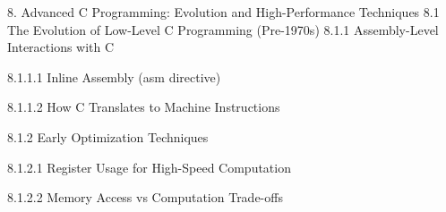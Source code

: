 8. Advanced C Programming: Evolution and High-Performance Techniques
8.1 The Evolution of Low-Level C Programming (Pre-1970s)
8.1.1 Assembly-Level Interactions with C

8.1.1.1 Inline Assembly (asm directive)

8.1.1.2 How C Translates to Machine Instructions

8.1.2 Early Optimization Techniques

8.1.2.1 Register Usage for High-Speed Computation

8.1.2.2 Memory Access vs Computation Trade-offs
\begin{comment}
8.2 Bit Manipulation and CPU Architecture Integration (K&R C – 1978-1989)
8.2.1 Understanding Bitwise Operations

8.2.1.1 Bit Manipulation Techniques (&, |, ^, ~)

8.2.1.2 Shift Operations for Efficient Computation (<<, >>)

8.2.2 Optimized Arithmetic Using Bitwise Tricks

8.2.2.1 Fast Multiplication and Division Using Shifts

8.2.2.2 Masking and Extracting Bits

8.3 ANSI C (1989 - 1999) – Expanding Optimization Possibilities
8.3.1 Writing Highly Efficient Code

8.3.1.1 Loop Unrolling for Performance

8.3.1.2 Function Inlining for Speed

8.3.2 Using Low-Level Memory Management

8.3.2.1 Direct Heap Manipulation (malloc, free)

8.3.2.2 Detecting Memory Corruption (valgrind, asan)

8.4 C99 (1999 - 2011) – CPU Instruction Set Extensions
8.4.1 SIMD and Low-Level Performance Gains

8.4.1.1 Using #include <emmintrin.h> for SSE2

8.4.1.2 Using #include <immintrin.h> for AVX/AVX2

8.4.2 Threading and Concurrency

8.4.2.1 Introduction to Multi-threaded Execution

8.4.2.2 Using pthread for Portable Threading

8.5 C11 (2011 - 2018) – Lock-Free Programming and Atomic Operations
8.5.1 Advanced Multi-threading Techniques

8.5.1.1 Using _Atomic for Safe Lock-Free Operations


\end{comment}
